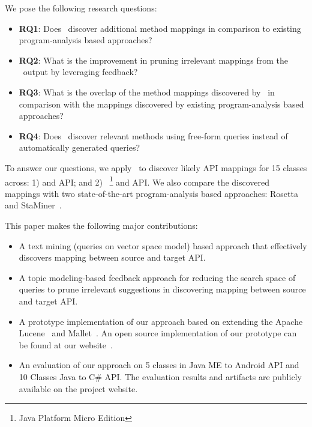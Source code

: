 We pose the following research questions:
\begin{itemize}
	
	\item\textbf{RQ1}: Does \tool\ discover additional method mappings in comparison to existing program-analysis based approaches?
	
	\item\textbf{RQ2}: What is the improvement in pruning irrelevant mappings from the \tool\ output by leveraging feedback?
	
	\item\textbf{RQ3}: What is the overlap of the method mappings discovered by \tool\ in comparison with the mappings discovered by existing program-analysis based approaches?
	
	
	\item\textbf{RQ4}: Does \tool\ discover relevant methods using free-form queries instead of automatically generated queries?
	
\end{itemize}
To answer our questions, we apply \tool\ to discover likely API mappings for 15 classes across:
1)  and  API; and 2) ~\footnote{Java Platform Micro Edition} and  API.
We also compare the discovered mappings with two state-of-the-art program-analysis based approaches: Rosetta~\cite{Gokhale2013ICSE} and StaMiner~\cite{nguyen2014statistical}.


This paper makes the following major contributions:
\begin{itemize}
	\item A text mining (queries on vector space model) based approach that effectively discovers mapping between source and target API.
	\item A topic modeling-based feedback approach for reducing the search space of queries to prune irrelevant suggestions in discovering mapping between source and target API. 
	\item A prototype implementation of our approach based on extending the Apache Lucene~\cite{lucene} and Mallet~\cite{McCallum}. An open source implementation of our prototype can be found at our website~\cite{projectWeb}. 
	\item An evaluation of our approach on 5 classes in Java ME to Android API and 10 Classes Java to C\# API. The evaluation results and artifacts are publicly available on the project website.
\end{itemize}


